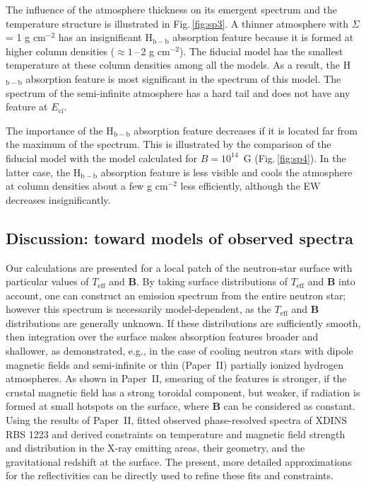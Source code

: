 \documentclass{aa}
\newcommand{\Eci}{E_\mathrm{ci}}
\newcommand{\Teff}{T_\mathrm{eff}}
\begin{document}
The influence of the atmosphere thickness on its emergent
spectrum and the temperature structure is illustrated in
Fig.\,\ref{fig:sp3}.  A thinner atmosphere with $\Sigma$ = 1
g cm$^{-2}$ has an insignificant  H$_\mathrm{b-b}$
absorption feature because it is formed at higher column
densities ($\approx1$\,--\,2  g cm$^{-2}$). The fiducial
model has the smallest temperature at these column densities
among all the models. As a result, the H$_\mathrm{b-b}$
absorption feature is most significant in the spectrum of
this model. The spectrum of the semi-infinite atmosphere has
a hard tail and does not have any feature at $\Eci$.

The importance of the H$_\mathrm{b-b}$ absorption feature
decreases if it is located far from the maximum of the 
spectrum. This is illustrated by the comparison of the
fiducial model with the model calculated for $B = 10^{14}$\,
G (Fig.\,\ref{fig:sp4}). In the latter case, the
H$_\mathrm{b-b}$ absorption feature is less visible and
cools the atmosphere at column densities about a few g
cm$^{-2}$ less efficiently,  although the EW decreases
insignificantly. 

\subsection{Discussion: toward models of observed spectra}

Our calculations are presented for a local patch of the
neutron-star surface with particular values of $\Teff$ and
$\bm{B}$. By taking surface distributions of $\Teff$ and
$\bm{B}$ into account, one can construct an emission
spectrum from the entire neutron star; however this spectrum
is necessarily model-dependent, as the $\Teff$ and $\bm{B}$
distributions are generally unknown. If these distributions
are sufficiently smooth, then integration over the surface
makes absorption features broader and shallower, as
demonstrated, e.g., in the case of cooling neutron stars
with dipole magnetic fields and semi-infinite
\citep{Ho-ea08} or thin (Paper~II) partially ionized
hydrogen atmospheres. As shown in Paper~II, smearing of the
features is stronger, if the crustal magnetic field has a
strong toroidal component, but weaker, if radiation is
formed at small hotspots on the surface, where $\bm{B}$ can
be considered as constant. Using the results of Paper~II,
\citet{Hambaryan-ea11} fitted observed phase-resolved
spectra of XDINS RBS 1223 and derived constraints on
temperature and magnetic field strength and distribution
in the X-ray emitting areas, their geometry, and the
gravitational redshift at the surface. The present, more
detailed approximations for the reflectivities can be
directly used to refine these fits and constraints.
\end{document}

